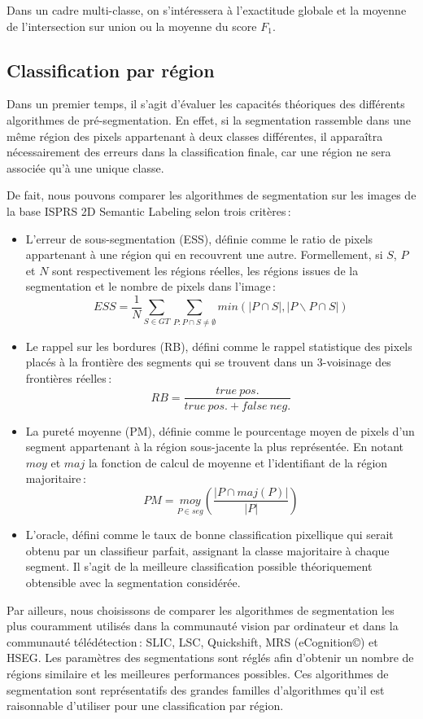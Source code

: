 Dans un cadre multi-classe, on s'intéressera à l'exactitude globale et la moyenne de l'intersection sur union ou la moyenne du score $F_1$.

\subsection{Classification par région}

Dans un premier temps, il s'agit d'évaluer les capacités théoriques des différents algorithmes de pré-segmentation. En effet, si la segmentation rassemble dans une même région des pixels appartenant à deux classes différentes, il apparaîtra nécessairement des erreurs dans la classification finale, car une région ne sera associée qu'à une unique classe.

De fait, nous pouvons comparer les algorithmes de segmentation sur les images de la base ISPRS 2D Semantic Labeling selon trois critères\,:
\begin{itemize}
  \item L'erreur de sous-segmentation (ESS), définie comme le ratio de pixels appartenant à une région qui en recouvrent une autre. Formellement, si $S$, $P$ et $N$ sont respectivement les régions réelles, les régions issues de la segmentation et le nombre de pixels dans l'image\,:
  $$ESS = \frac{1}{N} \sum_{S \in GT} \sum_{P : P \cap S \neq \emptyset} min(|P \cap S|, |P \backslash P \cap S|)$$
  \item Le rappel sur les bordures (RB), défini comme le rappel statistique des pixels placés à la frontière des segments qui se trouvent dans un 3-voisinage des frontières réelles\,:
  $$RB =  \frac{true\ pos.}{true\ pos. + false\ neg.}$$
  \item La pureté moyenne (PM), définie comme le pourcentage moyen de pixels d'un segment appartenant à la région sous-jacente la plus représentée. En notant $moy$ et $maj$ la fonction de calcul de moyenne et l'identifiant de la région majoritaire\,:
  $$PM = \underset{P \in seg}{moy} \left(\frac{| P \cap maj(P)|}{| P |}\right)$$
  \item L'oracle, défini comme le taux de bonne classification pixellique qui serait obtenu par un classifieur parfait, assignant la classe majoritaire à chaque segment. Il s'agit de la meilleure classification possible théoriquement obtensible avec la segmentation considérée.
\end{itemize}

Par ailleurs, nous choisissons de comparer les algorithmes de segmentation les plus couramment utilisés dans la communauté vision par ordinateur et dans la communauté télédétection\,: \gls{SLIC}, \gls{LSC}, Quickshift, \gls{MRS} (eCognition\copyright) et \gls{HSEG}. Les paramètres des segmentations sont réglés afin d'obtenir un nombre de régions similaire et les meilleures performances possibles. Ces algorithmes de segmentation sont représentatifs des grandes familles d'algorithmes qu'il est raisonnable d'utiliser pour une classification par région.

